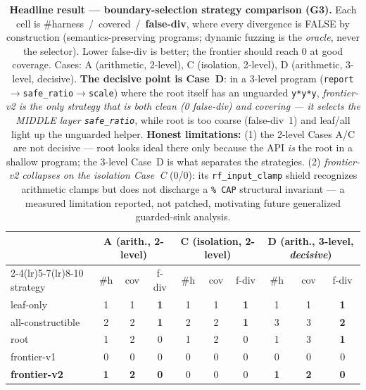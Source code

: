 \begin{table}[t]
  \centering
  \caption{\textbf{Headline result --- boundary-selection strategy comparison (G3).}
    Each cell is \#harness~/~covered~/~\textbf{false-div}, where every divergence
    is FALSE by construction (semantics-preserving programs; dynamic fuzzing is the
    \emph{oracle}, never the selector). Lower false-div is better; the frontier
    should reach 0 at good coverage. Cases: A (arithmetic, 2-level),
    C (isolation, 2-level), D (arithmetic, 3-level, decisive).
    \textbf{The decisive point is Case~D}: in a 3-level program
    (\texttt{report}$\to$\texttt{safe\_ratio}$\to$\texttt{scale}) where the root
    itself has an unguarded \texttt{y*y*y}, \emph{frontier-v2 is the only strategy
    that is both clean (0 false-div) and covering --- it selects the MIDDLE layer
    \texttt{safe\_ratio}}, while root is too coarse (false-div~1) and leaf/all light
    up the unguarded helper. \textbf{Honest limitations:} (1) the 2-level Cases A/C
    are not decisive --- root looks ideal there only because the API \emph{is} the
    root in a shallow program; the 3-level Case~D is what separates the strategies.
    (2) \emph{frontier-v2 collapses on the isolation Case~C} (0/0): its
    \texttt{rf\_input\_clamp} shield recognizes arithmetic clamps but does not
    discharge a \texttt{\% CAP} structural invariant --- a measured limitation
    reported, not patched, motivating future generalized guarded-sink analysis.}
  \label{tab:g3-headline}
  \begin{tabular}{l ccc ccc ccc}
    \toprule
    & \multicolumn{3}{c}{\textbf{A} (arith., 2-level)}
    & \multicolumn{3}{c}{\textbf{C} (isolation, 2-level)}
    & \multicolumn{3}{c}{\textbf{D} (arith., 3-level, \emph{decisive})} \\
    \cmidrule(lr){2-4}\cmidrule(lr){5-7}\cmidrule(lr){8-10}
    strategy & \#h & cov & f-div & \#h & cov & f-div & \#h & cov & f-div \\
    \midrule
    leaf-only          & 1 & 1 & \textbf{1} & 1 & 1 & \textbf{1} & 1 & 1 & \textbf{1} \\
    all-constructible  & 2 & 2 & \textbf{1} & 2 & 2 & \textbf{1} & 3 & 3 & \textbf{2} \\
    root               & 1 & 2 & 0          & 1 & 2 & 0          & 1 & 3 & \textbf{1} \\
    frontier-v1        & 0 & 0 & 0          & 0 & 0 & 0          & 0 & 0 & 0 \\
    \textbf{frontier-v2} & \textbf{1} & \textbf{2} & \textbf{0}
                         & 0 & 0 & 0
                         & \textbf{1} & \textbf{2} & \textbf{0} \\
    \bottomrule
  \end{tabular}
\end{table}


